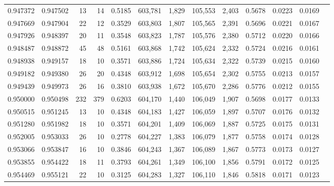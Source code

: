 \begin{tabular}{rrrrrrrrrrrrr}
0.947372 & 0.947502 &    13 &  14 &                                     0.5185 & 603,781 &   1,829 & 105,553 &   2,403 & 0.5678 & 0.0223 & 0.0169 \\
0.947669 & 0.947904 &    22 &  12 &                                     0.3529 & 603,803 &   1,807 & 105,565 &   2,391 & 0.5696 & 0.0221 & 0.0167 \\
0.947926 & 0.948397 &    20 &  11 &                                     0.3548 & 603,823 &   1,787 & 105,576 &   2,380 & 0.5712 & 0.0220 & 0.0166 \\
0.948487 & 0.948872 &    45 &  48 &                                     0.5161 & 603,868 &   1,742 & 105,624 &   2,332 & 0.5724 & 0.0216 & 0.0161 \\
0.948938 & 0.949157 &    18 &  10 &                                     0.3571 & 603,886 &   1,724 & 105,634 &   2,322 & 0.5739 & 0.0215 & 0.0160 \\
0.949182 & 0.949380 &    26 &  20 &                                     0.4348 & 603,912 &   1,698 & 105,654 &   2,302 & 0.5755 & 0.0213 & 0.0157 \\
0.949439 & 0.949973 &    26 &  16 &                                     0.3810 & 603,938 &   1,672 & 105,670 &   2,286 & 0.5776 & 0.0212 & 0.0155 \\
0.950000 & 0.950498 &   232 & 379 &                                     0.6203 & 604,170 &   1,440 & 106,049 &   1,907 & 0.5698 & 0.0177 & 0.0133 \\
0.950515 & 0.951245 &    13 &  10 &                                     0.4348 & 604,183 &   1,427 & 106,059 &   1,897 & 0.5707 & 0.0176 & 0.0132 \\
0.951280 & 0.951982 &    18 &  10 &                                     0.3571 & 604,201 &   1,409 & 106,069 &   1,887 & 0.5725 & 0.0175 & 0.0131 \\
0.952005 & 0.953033 &    26 &  10 &                                     0.2778 & 604,227 &   1,383 & 106,079 &   1,877 & 0.5758 & 0.0174 & 0.0128 \\
0.953066 & 0.953847 &    16 &  10 &                                     0.3846 & 604,243 &   1,367 & 106,089 &   1,867 & 0.5773 & 0.0173 & 0.0127 \\
0.953855 & 0.954422 &    18 &  11 &                                     0.3793 & 604,261 &   1,349 & 106,100 &   1,856 & 0.5791 & 0.0172 & 0.0125 \\
0.954469 & 0.955121 &    22 &  10 &                                     0.3125 & 604,283 &   1,327 & 106,110 &   1,846 & 0.5818 & 0.0171 & 0.0123 \\

\end{tabular}
